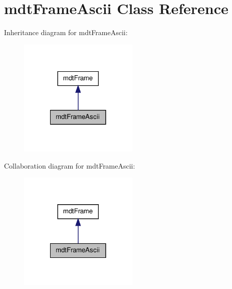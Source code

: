 \hypertarget{classmdt_frame_ascii}{
\section{mdtFrameAscii Class Reference}
\label{classmdt_frame_ascii}
}


Inheritance diagram for mdtFrameAscii:\nopagebreak
\begin{figure}[H]
\begin{center}
\leavevmode
\includegraphics[width=162pt]{classmdt_frame_ascii__inherit__graph}
\end{center}
\end{figure}


Collaboration diagram for mdtFrameAscii:\nopagebreak
\begin{figure}[H]
\begin{center}
\leavevmode
\includegraphics[width=162pt]{classmdt_frame_ascii__coll__graph}
\end{center}
\end{figure}
